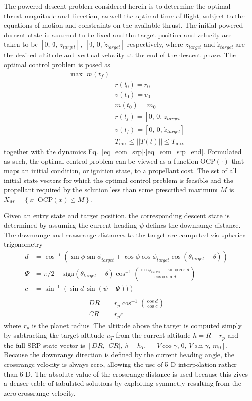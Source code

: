 \documentclass[letterpaper, preprint, paper,11pt]{AAS}
\begin{document}
The powered descent problem considered herein is to determine the optimal thrust magnitude and direction, as well the optimal time of flight, subject to the equations of motion and constraints on the available thrust.  The initial powered descent state is assumed to be fixed and the target position and velocity are taken to be $[0,\, 0,\, z_{target}]$,  $[0,\, 0,\, \dot{z}_{target}]$ respectively, where $z_{target}$ and $\dot{z}_{target}$ are the desired altitude and vertical velocity at the end of the descent phase. The optimal control problem is posed as
\begin{align}
\max \;m(t_f) \label{eq_srp_ocp}\\
&r(t_0) = r_0 \\
&v(t_0) = v_0 \\
&m(t_0) = m_0\\
&r(t_f) = [0,\, 0,\, z_{target}] \\
&v(t_f) = [0,\, 0,\, \dot{z}_{target}] \\
&T_{\min} \le ||T(t)|| \le T_{\max}
\end{align}
together with the dynamics Eq.~\ref{eq_eom_srp}-\ref{eq_eom_srp_end}. Formulated as such, the optimal control problem can be viewed as a function $\mathrm{OCP}(\cdot)$ that maps an initial condition, or ignition state, to a propellant cost. The set of all initial state vectors for which the optimal control problem is feasible and the propellant required by the solution less than some prescribed maximum $ M $ is $X_{M} = \left\{x\,|\, \mathrm{OCP}(x) \le M \right\}$.

Given an entry state and target position, the corresponding descent state is determined by assuming the current heading $\psi$ defines the downrange distance. The downrange and crossrange distances to the target are computed via spherical trigonometry \cite{joel_dissertation}
\begin{align}
d &= \cos^{-1}\left(\sin\phi\sin\phi_{target} +\cos\phi\cos\phi_{target}\cos(\theta_{target}-\theta)        \right) \\
\Psi &= \pi/2 - \mathrm{sign}(\theta_{target}-\theta) \cos^{-1}\left(\frac{\sin\phi_{target}-\sin\phi\cos d}{\cos\phi\sin d}  \right) \\
c &= \sin^{-1}\left(\sin d\,\sin(\psi-\Psi))\right) \\
\end{align}
\begin{align}
DR &= r_p\cos^{-1}\left(\frac{\cos d}{\cos c}\right)\\
CR &= r_pc
\end{align}
where $r_p$ is the planet radius. The altitude above the target is computed simply by subtracting the target altitude $h_T$ from the current altitude $h = R-r_p$ and the full SRP state vector is $[DR,\, |CR|,\, h-h_T,\, -V\cos\gamma,\, 0,\, V\sin\gamma,\, m_0]$. Because the downrange direction is defined by the current heading angle, the crossrange velocity is always zero, allowing the use of 5-D interpolation rather than 6-D. The absolute value of the crossrange distance is used because this gives a denser table of tabulated solutions by exploiting symmetry resulting from the zero crossrange velocity. 
\end{document}
